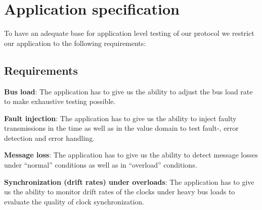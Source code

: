 \section{Application specification}
\label{sec:app:specification}

To have an adequate base for application level testing of our protocol we restrict our application to the following requirements:

\subsection{Requirements}
\label{sec:app:specification:req}

\begin{req}
\label{req:app:load}
\textbf{Bus load}: The application has to give us the ability to adjust the bus load rate to make exhaustive testing possible.
\end{req}

\begin{req}
\label{req:app:fault_injection}
\textbf{Fault injection}: The application has to give us the ability to inject faulty transmissions in the time as well as in the value domain to test fault-, error detection and error handling.
\end{req}

\begin{req}
\label{req:app:message_loss}
\textbf{Message loss}: The application has to give us the ability to detect message losses under ``normal'' conditions as well as in ``overload'' conditions.
\end{req}


\begin{req}
\label{req:app:sync_under_overloads}
\textbf{Synchronization (drift rates) under overloads}: The application has to give us the ability to monitor drift rates of the clocks under heavy bus loads to evaluate the quality of clock synchronization.
\end{req}


